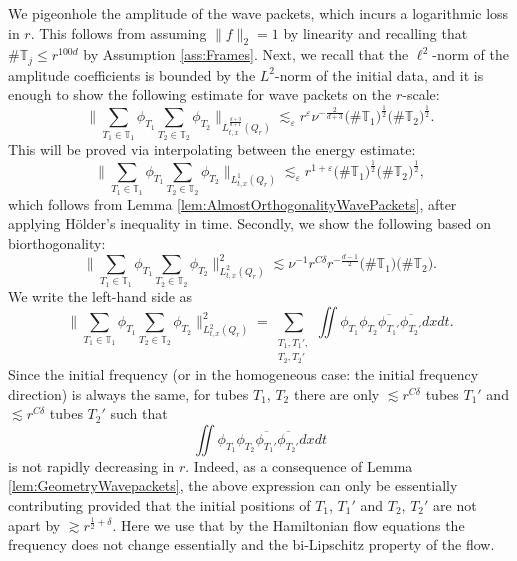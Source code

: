 \documentclass{amsart}
\theoremstyle{definition}
\newcommand{\T}{\mathbb{T}}
\begin{document}
We pigeonhole the amplitude of the wave packets, which incurs a logarithmic loss in $r$. This follows from assuming $\|f \|_2 = 1$ by linearity and recalling that $\# \T_j \leq r^{100d}$ by Assumption \ref{ass:Frames}. Next, we recall that the $\ell^2$-norm of the amplitude coefficients is bounded by the $L^2$-norm of the initial data, and it is enough to show the following estimate for wave packets on the $r$-scale:
\begin{equation*}
   \big\| \sum_{T_1 \in \T_1} \phi_{T_1} \sum_{T_2 \in \T_2} \phi_{T_2} \big\|_{L^{\frac{d+3}{d+1}}_{t,x}(Q_r)} \lesssim_{\varepsilon} r^{\varepsilon} \nu^{-\frac{2}{d+3}} \big( \# \T_1)^{\frac{1}{2}} \big( \# \T_2 \big)^{\frac{1}{2}}.
\end{equation*}
This will be proved via interpolating between the energy estimate:
\begin{equation*}
    \big\| \sum_{T_1 \in \T_1} \phi_{T_1} \sum_{T_2 \in \T_2} \phi_{T_2} \big\|_{L^1_{t,x}(Q_r)} \lesssim_{\varepsilon} r^{1+\varepsilon} \big( \# \T_1)^{\frac{1}{2}} \big( \# \T_2 \big)^{\frac{1}{2}},
\end{equation*}
which follows from Lemma \ref{lem:AlmostOrthogonalityWavePackets}, after applying H\"older's inequality in time.
Secondly, we show the following based on biorthogonality:
\begin{equation*}
    \big\| \sum_{T_1 \in \T_1} \phi_{T_1} \sum_{T_2 \in \T_2} \phi_{T_2} \big\|_{L^2_{t,x}(Q_r)}^2 \lesssim \nu^{-1} r^{C \delta} r^{- \frac{d-1}{2}} \big( \# \T_1 \big) \big( \# \T_2 \big).
\end{equation*}
We write the left-hand side as
\begin{equation*}
    \big\| \sum_{T_1 \in \T_1} \phi_{T_1} \sum_{T_2 \in \T_2} \phi_{T_2} \big\|_{L^2_{t,x}(Q_r)}^2 = \sum_{\substack{T_1,T_1', \\ T_2,T_2'}} \iint \phi_{T_1} \phi_{T_2} \overline{\phi_{T_1'}} \overline{\phi_{T_2'}} dx dt.
\end{equation*}
Since the initial frequency (or in the homogeneous case: the initial frequency direction) is always the same, for tubes $T_1$, $T_2$ there are only $\lesssim r^{C \delta}$ tubes $T_1'$ and $\lesssim r^{C \delta}$ tubes $T_2'$ such that 
\begin{equation*}
    \iint \phi_{T_1} \phi_{T_2} \overline{\phi_{T_1'}} \overline{\phi_{T_2'}} dx dt
\end{equation*}
is not rapidly decreasing in $r$. Indeed, as a consequence of Lemma \ref{lem:GeometryWavepackets}, the above expression can only be essentially contributing provided that the initial positions of $T_1$, $T_1'$ and $T_2$, $T_2'$ are not apart by $\gtrsim r^{\frac{1}{2}+\delta}$. Here we use that by the Hamiltonian flow equations the frequency does not change essentially and the bi-Lipschitz property of the flow.
\end{document}
